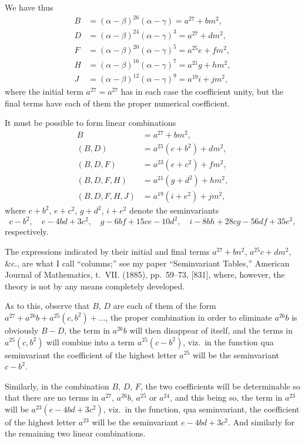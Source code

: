 \documentclass[11pt,a4paper]{book}
\begin{document}
We have thus
\begin{align*}
B &= (\alpha - \beta)^{26}(\alpha - \gamma) = a^{27} + bm^2,\\
D &= (\alpha - \beta)^{24}(\alpha - \gamma)^3 = a^{27} + dm^2,\\
F &= (\alpha - \beta)^{20}(\alpha - \gamma)^5 = a^{25}e + fm^2,\\
H &= (\alpha - \beta)^{16}(\alpha - \gamma)^7 = a^{21}g + hm^2,\\
J &= (\alpha - \beta)^{12}(\alpha - \gamma)^9 = a^{19}i + jm^2,
\end{align*}
where the initial term $a^{27} = a^{27}$ has in each case the coefficient unity, but the final terms have each of them the proper numerical coefficient.

It must be possible to form linear combinations
\begin{align*}
B &= a^{27} + bm^2,\\
(B, D) &= a^{25}(c + b^2) + dm^2,\\
(B, D, F) &= a^{23}(e + c^2) + fm^2,\\
(B, D, F, H) &= a^{21}(g + d^2) + hm^2,\\
(B, D, F, H, J) &= a^{19}(i + e^2) + jm^2,
\end{align*}
where $c + b^2$, $e + c^2$, $g + d^2$, $i + e^2$ denote the seminvariants
\[
c - b^2, \quad e - 4bd + 3c^2, \quad g - 6bf + 15ce - 10d^2, \quad i - 8bh + 28cg - 56df + 35e^2,
\]
respectively.

The expressions indicated by their initial and final terms $a^{27} + bn^2$, $a^{25}c + dm^2$, \&c., are what I call ``columns;'' see my paper ``Seminvariant Tables,'' American Journal of Mathematics, t.~VII. (1885), pp.~59--73, [831], where, however, the theory is not by any means completely developed.

As to this, observe that $B$, $D$ are each of them of the form $a^{27} + a^{26}b + a^{25}(c, b^2) + \ldots$, the proper combination in order to eliminate $a^{26}b$ is obviously $B - D$, the term in $a^{26}b$ will then disappear of itself, and the terms in $a^{25}(c, b^2)$ will combine into a term $a^{25}(c - b^2)$, viz.\ in the function qua seminvariant the coefficient of the highest letter $a^{25}$ will be the seminvariant $c - b^2$.

Similarly, in the combination $B$, $D$, $F$, the two coefficients will be determinable so that there are no terms in $a^{27}$, $a^{26}b$, $a^{25}$ or $a^{24}$, and this being so, the term in $a^{23}$ will be $a^{23}(e - 4bd + 3c^2)$, viz.\ in the function, qua seminvariant, the coefficient of the highest letter $a^{23}$ will be the seminvariant $e - 4bd + 3c^2$. And similarly for the remaining two linear combinations.
\end{document}
